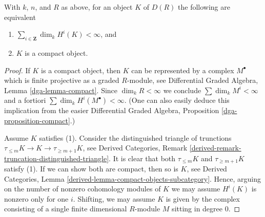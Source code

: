 \begin{lemma}
\label{lemma-perfect-for-R}
With $k$, $n$, and $R$ as above, for an object $K$ of $D(R)$
the following are equivalent
\begin{enumerate}
\item $\sum_{i \in \mathbf{Z}} \dim_k H^i(K) < \infty$, and
\item $K$ is a compact object.
\end{enumerate}
\end{lemma}

\begin{proof}
If $K$ is a compact object, then $K$ can be represented by a complex
$M^\bullet$ which is finite projective as a graded $R$-module, see
Differential Graded Algebra, Lemma \ref{dga-lemma-compact}.
Since $\dim_k R < \infty$ we conclude $\sum \dim_k M^i < \infty$
and a fortiori $\sum \dim_k H^i(M^\bullet) < \infty$.
(One can also easily deduce this implication from the easier
Differential Graded Algebra, Proposition \ref{dga-proposition-compact}.)

\medskip\noindent
Assume $K$ satisfies (1). Consider the distinguished triangle
of trunctions $\tau_{\leq m}K \to K \to \tau_{\geq m + 1}K$, see
Derived Categories, Remark
\ref{derived-remark-truncation-distinguished-triangle}.
It is clear that both $\tau_{\leq m}K$ and $\tau_{\geq m + 1} K$
satisfy (1). If we can show both are compact, then so is $K$, see
Derived Categories, Lemma \ref{derived-lemma-compact-objects-subcategory}.
Hence, arguing on the number of nonzero cohomology modules of $K$
we may assume $H^i(K)$ is nonzero only for one $i$.
Shifting, we may assume $K$ is given by the complex
consisting of a single finite dimensional $R$-module $M$ sitting
in degree $0$.


\end{proof}
